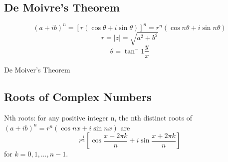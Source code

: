 \subsection{De Moivre's Theorem}
$$
(a + ib)^n = [r(\cos \theta + i \sin \theta)]^n = r^n (\cos n\theta + i \sin n\theta)
$$
$$
r = |z| = \sqrt{a^2 + b^2}
$$
$$
\theta = \tan^-1 \frac{y}{x}
$$

De Moiver's Theorem 

\subsection{Roots of Complex Numbers}

Nth roots: for any positive integer n, the nth distinct roots of
$(a+ ib)^n = r^n (\cos nx +i\sin nx)$ are
$$
r^{\frac{1}{n}} \left[\cos \frac{x + 2\pi k}{n} + i\sin \frac{x + 2\pi k}{n}\right]
$$
for $k = 0, 1, \dots, n-1$.